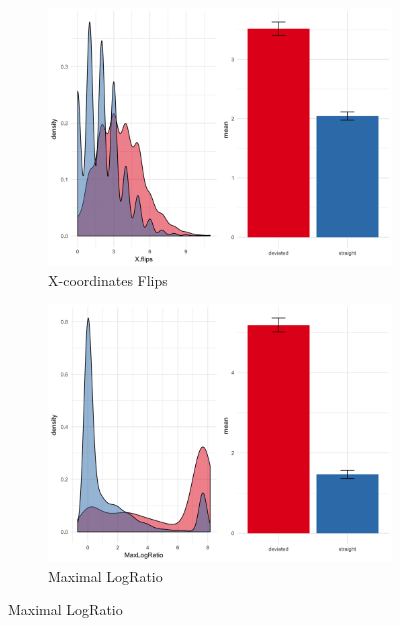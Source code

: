 \documentclass{article}
\begin{document}
\begin{itemize}
\begin{figure}
\begin{subfigure}[b]{0.45\textwidth}
\includegraphics[width=\textwidth]{XFlips-calibration.png}
\caption{X-coordinates Flips}
\end{subfigure}
%
\begin{subfigure}[b]{0.45\textwidth}
\includegraphics[width=\textwidth]{MaxLogRatio-calibration.png}
\caption{Maximal LogRatio}
\end{subfigure}


\end{figure}
\end{itemize}
\end{document}
